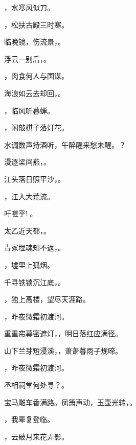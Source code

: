 \documentclass[12pt, a4paper, addpoints]{exam}
\begin{document}
\begin{questions}
\question[1] \uline{\qquad\qquad\qquad}，水寒风似刀。

\question[1] \uline{\qquad\qquad\qquad}，松扶古殿三时寒。

\question[1] 临晚镜，伤流景，\uline{\qquad\qquad\qquad}。

\question[1] 浮云一别后，\uline{\qquad\qquad\qquad}。

\question[1] \uline{\qquad\qquad\qquad}，肉食何人与国谋。

\question[1] 海浪如云去却回，\uline{\qquad\qquad\qquad}。

\question[1] \uline{\qquad\qquad\qquad}，临风听暮蝉。

\question[1] \uline{\qquad\qquad\qquad}，闲敲棋子落灯花。

\question[1] 水调数声持酒听，午醉醒来愁未醒。\uline{\qquad\qquad\qquad}？

\question[1] 漫逐梁间燕，\uline{\qquad\qquad\qquad}。

\question[1] 江头落日照平沙，\uline{\qquad\qquad\qquad}。

\question[1] \uline{\qquad\qquad\qquad}，江入大荒流。

\question[1] 吁嗟乎! \uline{\qquad\qquad\qquad}。

\question[1] 太乙近天都，\uline{\qquad\qquad\qquad}。

\question[1] 青冢埋魂知不返，\uline{\qquad\qquad\qquad}。

\question[1] \uline{\qquad\qquad\qquad}，墟里上孤烟。

\question[1] 千寻铁锁沉江底，\uline{\qquad\qquad\qquad}。

\question[1] \uline{\qquad\qquad\qquad}，独上高楼，望尽天涯路。

\question[1] \uline{\qquad\qquad\qquad}，昨夜微霜初渡河。

\question[1] 重重帘幕密遮灯，\uline{\qquad\qquad\qquad}，明日落红应满径。

\question[1] 山下兰芽短浸溪，\uline{\qquad\qquad\qquad}，萧萧暮雨子规啼。

\question[1] \uline{\qquad\qquad\qquad}，昨夜微霜初渡河。

\question[1] 丞相祠堂何处寻？\uline{\qquad\qquad\qquad}。

\question[1] 宝马雕车香满路。凤箫声动，玉壶光转，\uline{\qquad\qquad\qquad}。

\question[1] \uline{\qquad\qquad\qquad}，我辈复登临。

\question[1] \uline{\qquad\qquad\qquad}，云破月来花弄影。


\end{questions}
\end{document}
